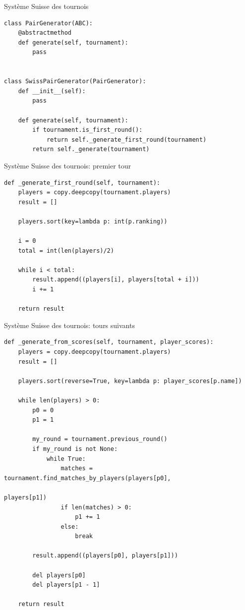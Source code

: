 \begin{frame}[fragile]{Système Suisse des tournois}
  \footnotesize
  \begin{verbatim}
class PairGenerator(ABC):
    @abstractmethod
    def generate(self, tournament):
        pass


class SwissPairGenerator(PairGenerator):
    def __init__(self):
        pass

    def generate(self, tournament):
        if tournament.is_first_round():
            return self._generate_first_round(tournament)
        return self._generate(tournament)
  \end{verbatim}
\end{frame}

\begin{frame}[fragile]{Système Suisse des tournois: premier tour}
  \footnotesize
  \begin{verbatim}
def _generate_first_round(self, tournament):
    players = copy.deepcopy(tournament.players)
    result = []

    players.sort(key=lambda p: int(p.ranking))

    i = 0
    total = int(len(players)/2)

    while i < total:
        result.append((players[i], players[total + i]))
        i += 1

    return result
  \end{verbatim}
\end{frame}

\begin{frame}[fragile]{Système Suisse des tournois: tours suivants}
  \tiny
  \begin{verbatim}
def _generate_from_scores(self, tournament, player_scores):
    players = copy.deepcopy(tournament.players)
    result = []

    players.sort(reverse=True, key=lambda p: player_scores[p.name])

    while len(players) > 0:
        p0 = 0
        p1 = 1

        my_round = tournament.previous_round()
        if my_round is not None:
            while True:
                matches = tournament.find_matches_by_players(players[p0],
                                                             players[p1])
                if len(matches) > 0:
                    p1 += 1
                else:
                    break

        result.append((players[p0], players[p1]))

        del players[p0]
        del players[p1 - 1]

    return result
  \end{verbatim}
\end{frame}

